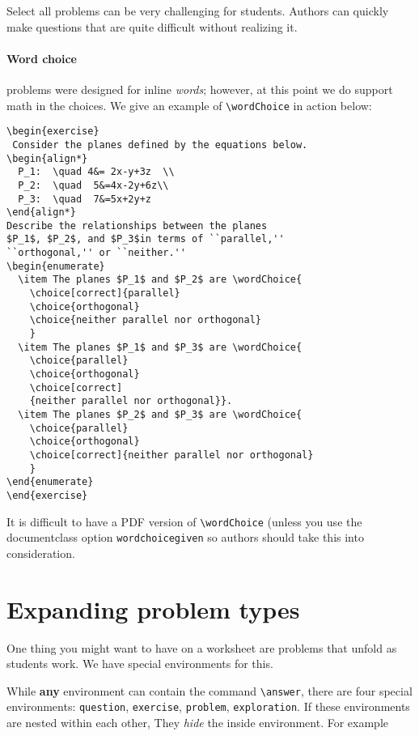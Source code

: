 \documentclass{ximera}
\begin{document}
Select all problems can be very challenging for students. Authors can quickly
make
questions that are quite difficult without realizing it.

\paragraph{Word choice}
problems were designed for inline \textit{words}; however, at this
point we
do support math in the choices. We give an example of \verb!\wordChoice! in
action below:
\begin{verbatim}
\begin{exercise}
 Consider the planes defined by the equations below.
\begin{align*}
  P_1:  \quad 4&= 2x-y+3z  \\
  P_2:  \quad  5&=4x-2y+6z\\ 
  P_3:  \quad  7&=5x+2y+z
\end{align*}
Describe the relationships between the planes 
$P_1$, $P_2$, and $P_3$in terms of ``parallel,'' 
``orthogonal,'' or ``neither.''
\begin{enumerate}
  \item The planes $P_1$ and $P_2$ are \wordChoice{
    \choice[correct]{parallel}
    \choice{orthogonal}
    \choice{neither parallel nor orthogonal}
    }
  \item The planes $P_1$ and $P_3$ are \wordChoice{
    \choice{parallel}
    \choice{orthogonal}
    \choice[correct]
    {neither parallel nor orthogonal}}.
  \item The planes $P_2$ and $P_3$ are \wordChoice{
    \choice{parallel}
    \choice{orthogonal}
    \choice[correct]{neither parallel nor orthogonal}
    }
\end{enumerate}
\end{exercise}
\end{verbatim}
It is difficult to have a PDF version of \verb!\wordChoice! (unless you use the
documentclass option \texttt{wordchoicegiven} so authors should
take this into consideration.

\section{Expanding problem types}

One thing you might want to have on a worksheet are problems that unfold as
students work. We have special environments for this.

While \textbf{any} environment can contain the command \verb|\answer|,
there are four special environments: \verb|question|, \verb|exercise|,
\verb|problem|, \verb|exploration|. If these environments are nested within
each other, They \textit{hide} the inside environment. For example
\end{document}
